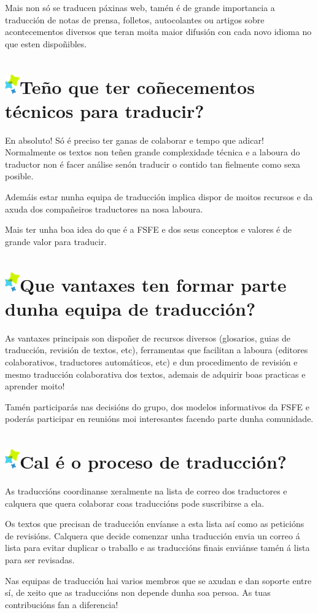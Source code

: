 \documentclass[10pt,foldmark,tumble]{leaflet}
\newcommand{\tit}[1]{\section{\includegraphics{item.png}#1}}
\begin{document}
Mais non só se traducen páxinas web, tamén é de grande importancia a traducción de notas de prensa, folletos, autocolantes ou artigos sobre acontecementos diversos que teran moita maior difusión con cada novo idioma no que esten dispoñibles.

\tit{Teño que ter coñecementos técnicos para traducir?}

En absoluto! Só é preciso ter ganas de colaborar e tempo que adicar! Normalmente os textos non teñen grande complexidade técnica e a laboura do traductor non é facer análise senón traducir o contido tan fielmente como sexa posible. 

Ademáis estar nunha equipa de traducción implica dispor de moitos recursos e da axuda dos compañeiros traductores na nosa laboura.

Mais ter unha boa idea do que é a FSFE e dos seus conceptos e valores é de grande valor para traducir.

\tit{Que vantaxes ten formar parte dunha equipa de traducción?}

As vantaxes principais son dispoñer de recursos diversos (glosarios, guias de traducción, revisión de textos, etc), ferramentas que facilitan a laboura (editores colaborativos, traductores automáticos, etc) e dun procedimento de revisión e mesmo traducción colaborativa dos textos, ademais de adquirir boas practicas e aprender moito!

Tamén participarás nas decisións do grupo, dos modelos informativos da FSFE e poderás participar en reunións moi interesantes facendo parte dunha comunidade.

\tit{Cal é o proceso de traducción?}

As traduccións coordinanse xeralmente na lista de correo dos traductores e calquera que quera colaborar coas traduccións pode suscribirse a ela. 

Os textos que precisan de traducción envíanse a esta lista así como as peticións de revisións. Calquera que decide comenzar unha traducción envia un correo á lista para evitar duplicar o traballo e as traduccións finais enviánse tamén á lista para ser revisadas.

Nas equipas de traducción hai varios membros que se axudan e dan soporte entre sí, de xeito que as traduccións non depende dunha soa persoa. As tuas contribucións fan a diferencia!



\vspace{10em}
\end{document}
